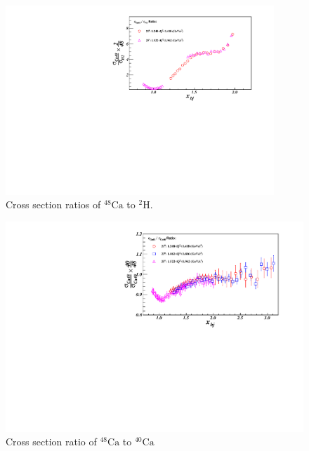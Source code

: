 \begin{figure}[!ht]
  \begin{center}
    \includegraphics[type=pdf,ext=.pdf,read=.pdf,width=0.9\textwidth]{./figures/xs/Ca48_H2_XS_Ratio}
   \caption[Cross section ratios of $\mathrm{^{48}Ca}$ to $\mathrm{^{2}H}$]{\footnotesize{Cross section ratios of $\mathrm{^{48}Ca}$ to $\mathrm{^{2}H}$.}}
    \label{ca48_h2_xgt2}
  \end{center}
\end{figure}
\begin{figure}[!ht]
  \begin{center}
    \includegraphics[type=pdf,ext=.pdf,read=.pdf,width=1.\textwidth]{./figures/xs/Ca48_Ca40_XS_Ratio}
    \caption[Cross section ratio of $\mathrm{^{48}Ca}$ to $\mathrm{^{40}Ca}$]{\footnotesize{Cross section ratio of $\mathrm{^{48}Ca}$ to $\mathrm{^{40}Ca}$}}
    \label{ratio_ca48_ca40}
  \end{center}
\end{figure}
